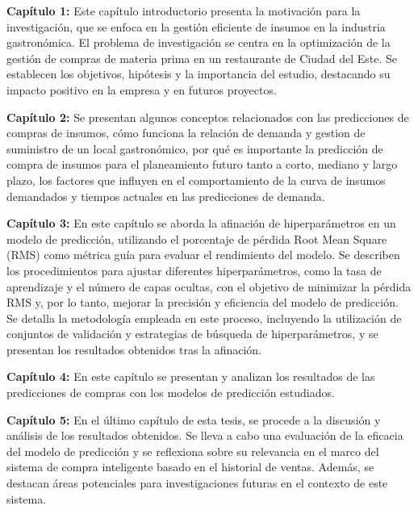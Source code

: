 \vspace{1\baselineskip}
\textbf{Capítulo 1:} 
Este capítulo introductorio presenta la motivación para la investigación, que se enfoca en la gestión eficiente de insumos en la industria gastronómica. El problema de investigación se centra en la optimización de la gestión de compras de materia prima en un restaurante de Ciudad del Este. Se establecen los objetivos, hipótesis y la importancia del estudio, destacando su impacto positivo en la empresa y en futuros proyectos.

\vspace{1\baselineskip}
\textbf{Capítulo 2:} 
Se presentan algunos conceptos relacionados con las predicciones de compras de insumos, cómo funciona la relación de demanda y gestion de suministro de un local gastronómico, por qué es importante la predicción de compra de insumos para el planeamiento futuro tanto a corto, mediano y largo plazo, los factores que influyen en el comportamiento de la curva de insumos demandados y tiempos actuales en las predicciones de demanda. 

\vspace{1\baselineskip}
\textbf{Capítulo 3:} 
En este capítulo se aborda la afinación de hiperparámetros en un modelo de predicción, utilizando el porcentaje de pérdida Root Mean Square (RMS) como métrica guía para evaluar el rendimiento del modelo. Se describen los procedimientos para ajustar diferentes hiperparámetros, como la tasa de aprendizaje y el número de capas ocultas, con el objetivo de minimizar la pérdida RMS y, por lo tanto, mejorar la precisión y eficiencia del modelo de predicción. Se detalla la metodología empleada en este proceso, incluyendo la utilización de conjuntos de validación y estrategias de búsqueda de hiperparámetros, y se presentan los resultados obtenidos tras la afinación.

\vspace{1\baselineskip}
\textbf{Capítulo 4:}
En este capítulo se presentan y analizan los resultados de las predicciones
de compras con los modelos de  predicción estudiados. 

\vspace{1\baselineskip}
\textbf{Capítulo 5:}
En el último capítulo de esta tesis, se procede a la discusión y análisis de los resultados obtenidos. Se lleva a cabo una evaluación de la eficacia del modelo de predicción y se reflexiona sobre su relevancia en el marco del sistema de compra inteligente basado en el historial de ventas. Además, se destacan áreas potenciales para investigaciones futuras en el contexto de este sistema.
